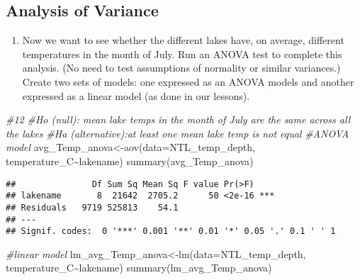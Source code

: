 \documentclass[
]{article}
\newenvironment{Shaded}{\begin{snugshade}}{\end{snugshade}}
\newcommand{\AttributeTok}[1]{\textcolor[rgb]{0.77,0.63,0.00}{#1}}
\newcommand{\CommentTok}[1]{\textcolor[rgb]{0.56,0.35,0.01}{\textit{#1}}}
\newcommand{\FunctionTok}[1]{\textcolor[rgb]{0.00,0.00,0.00}{#1}}
\newcommand{\NormalTok}[1]{#1}
\newcommand{\OtherTok}[1]{\textcolor[rgb]{0.56,0.35,0.01}{#1}}
\newcommand{\SpecialCharTok}[1]{\textcolor[rgb]{0.00,0.00,0.00}{#1}}
\providecommand{\tightlist}{%
  \setlength{\itemsep}{0pt}\setlength{\parskip}{0pt}}
\begin{document}
\hypertarget{analysis-of-variance}{%
\subsection{Analysis of Variance}\label{analysis-of-variance}}

\begin{enumerate}
\def\labelenumi{\arabic{enumi}.}
\setcounter{enumi}{11}
\tightlist
\item
  Now we want to see whether the different lakes have, on average,
  different temperatures in the month of July. Run an ANOVA test to
  complete this analysis. (No need to test assumptions of normality or
  similar variances.) Create two sets of models: one expressed as an
  ANOVA models and another expressed as a linear model (as done in our
  lessons).
\end{enumerate}

\begin{Shaded}
\begin{Highlighting}[]
\CommentTok{\#12}
\CommentTok{\#Ho (null): mean lake temps in the month of July are the same across all the lakes}
\CommentTok{\#Ha (alternative):at least one mean lake temp is not equal}
\CommentTok{\#ANOVA model }
\NormalTok{avg\_Temp\_anova}\OtherTok{\textless{}{-}}\FunctionTok{aov}\NormalTok{(}\AttributeTok{data=}\NormalTok{NTL\_temp\_depth, temperature\_C}\SpecialCharTok{\textasciitilde{}}\NormalTok{lakename)}
\FunctionTok{summary}\NormalTok{(avg\_Temp\_anova)}
\end{Highlighting}
\end{Shaded}

\begin{verbatim}
##               Df Sum Sq Mean Sq F value Pr(>F)    
## lakename       8  21642  2705.2      50 <2e-16 ***
## Residuals   9719 525813    54.1                   
## ---
## Signif. codes:  0 '***' 0.001 '**' 0.01 '*' 0.05 '.' 0.1 ' ' 1
\end{verbatim}

\begin{Shaded}
\begin{Highlighting}[]
\CommentTok{\#linear model }
\NormalTok{lm\_avg\_Temp\_anova}\OtherTok{\textless{}{-}}\FunctionTok{lm}\NormalTok{(}\AttributeTok{data=}\NormalTok{NTL\_temp\_depth, temperature\_C}\SpecialCharTok{\textasciitilde{}}\NormalTok{lakename)}
\FunctionTok{summary}\NormalTok{(lm\_avg\_Temp\_anova)}
\end{Highlighting}
\end{Shaded}
\end{document}
